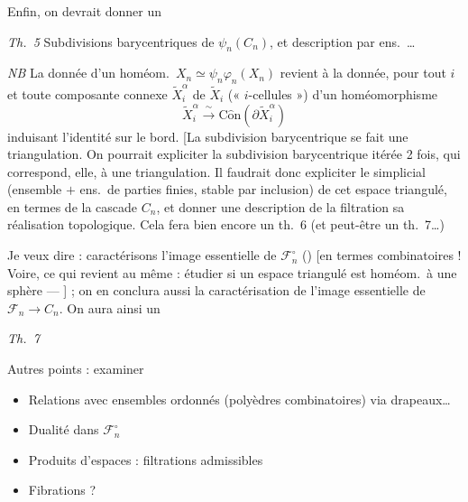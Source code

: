 \documentclass[11pt,a4paper]{article}
\begin{document}

Enfin, on devrait donner un

\emph{Th.\ 5} Subdivisions barycentriques de $\psi_n(C_n)$, et description
par ens.\ \ldots
{}

\emph{NB} La donnée d'un homéom.\ $X_n \simeq \psi_n\varphi_n(X_n)$
revient à la donnée, pour tout $i$ et toute composante connexe
$\widetilde{X}_i^\alpha$ de $\widetilde{X}_i$ (« $i$-cellules ») d'un
homéomorphisme
\[
  \widetilde{X}_i^\alpha \xrightarrow{\ \sim\ }
  \mathrm{C\hat{o}n}(\partial\widetilde{X}_i^\alpha)
\]
induisant l'identité sur le bord. [La subdivision barycentrique se fait
 une triangulation. On pourrait expliciter la
subdivision barycentrique itérée 2 fois, qui correspond, elle, à une
triangulation. Il faudrait donc expliciter le 
simplicial (ensemble $+$ ens.\ de parties finies, stable par inclusion) de
cet espace triangulé, en termes de la cascade $C_n$, et donner une
description \ill{} \ill{} \ill{} de la filtration \ill{} \ill{} sa
réalisation topologique. Cela fera bien encore un th.\ 6 (et peut-être un
th.\ 7\ldots)

Je veux dire : caractérisons l'image essentielle de
$\mathcal{F}_n^\circ$ () [en termes
combinatoires ! Voire, ce qui revient au même : étudier si un espace
triangulé est homéom.\ à une sphère --- 
 ] ; on en conclura aussi
la caractérisation de l'image essentielle de $\mathcal{F}_n \to C_n$. On
aura ainsi un

\emph{Th.\ 7}

Autres points : examiner
\begin{itemize}
  \item[$*$] Relations avec ensembles ordonnés (polyèdres combinatoires)
  via drapeaux\ldots
  \item[$*$] Dualité dans $\mathcal{F}_n^\circ$
  \item[$*$] Produits d'espaces : filtrations admissibles
  \item[$*$] Fibrations ?
\end{itemize}
\end{document}
